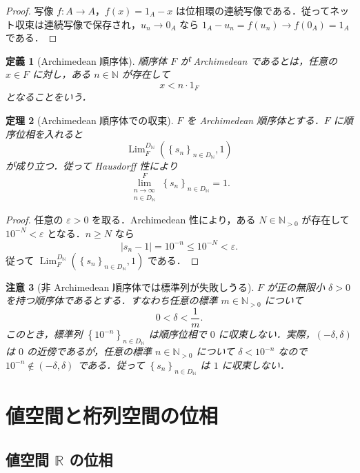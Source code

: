 \documentclass[a4paper,11pt]{ltjsarticle}
\theoremstyle{jpdef}
\newtheorem{definition}{定義}[section]
\newtheorem{warning}[definition]{注意}
\theoremstyle{jpthm}
\newtheorem{theorem}[definition]{定理}
\newcommand{\N}{\mathbb{N}}
\newcommand{\R}{\mathbb{R}}
\newcommand{\Lim}{\operatorname{Lim}}
\newcommand{\Ns}{\N_{>0}}
\newcommand{\DN}{D_{\N}}
\newcommand{\abs}[1]{\left\lvert#1\right\rvert}
\newcommand{\seq}[2]{\left\{#1\right\}_{#2}}
\newcommand{\eps}{\varepsilon}
\begin{document}
\begin{proof}
写像 \(f:A\to A\)，\(f(x)=1_A-x\) は位相環の連続写像である．従ってネット収束は連続写像で保存され，\(u_n\to0_A\) なら \(1_A-u_n=f(u_n)\to f(0_A)=1_A\) である．
\end{proof}

\begin{definition}[Archimedean 順序体]
順序体 \(F\) が Archimedean であるとは，任意の \(x\in F\) に対し，ある \(n\in\N\) が存在して
\[
  x<n\cdot1_F
\]
となることをいう．
\end{definition}

\begin{theorem}[Archimedean 順序体での収束]
\(F\) を Archimedean 順序体とする．\(F\) に順序位相を入れると
\[
  \Lim_F^{\DN}(\seq{s_n}{n\in\DN},1)
\]
が成り立つ．従って Hausdorff 性により
\[
  \lim_{\substack{n\to\infty\\ n\in\DN}}^{F}\seq{s_n}{n\in\DN}=1.
\]
\end{theorem}

\begin{proof}
任意の \(\eps>0\) を取る．Archimedean 性により，ある \(N\in\Ns\) が存在して \(10^{-N}<\eps\) となる．\(n\ge N\) なら
\[
  \abs{s_n-1}=10^{-n}\le10^{-N}<\eps.
\]
従って \(\Lim_F^{\DN}(\seq{s_n}{n\in\DN},1)\) である．
\end{proof}

\begin{warning}[非 Archimedean 順序体では標準列が失敗しうる]
\(F\) が正の無限小 \(\delta>0\) を持つ順序体であるとする．すなわち任意の標準 \(m\in\Ns\) について
\[
  0<\delta<\frac1m.
\]
このとき，標準列 \(\seq{10^{-n}}{n\in\DN}\) は順序位相で \(0\) に収束しない．実際，\((-\delta,\delta)\) は \(0\) の近傍であるが，任意の標準 \(n\in\Ns\) について \(\delta<10^{-n}\) なので \(10^{-n}\notin(-\delta,
\delta)\) である．従って \(\seq{s_n}{n\in\DN}\) は \(1\) に収束しない．
\end{warning}

\section{値空間と桁列空間の位相}

\subsection{値空間 \(\R\) の位相}
\end{document}

